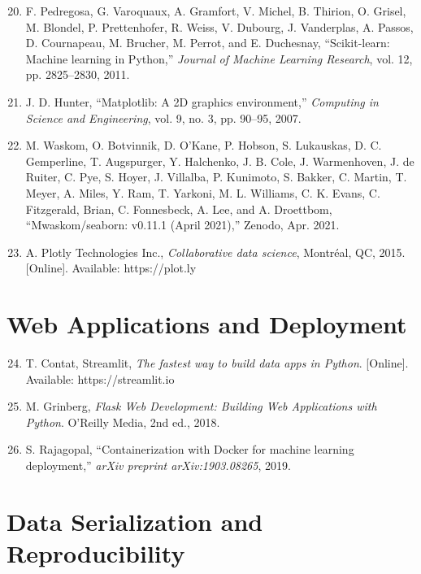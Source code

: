 \begin{enumerate}
  \setcounter{enumi}{19}
  \item F. Pedregosa, G. Varoquaux, A. Gramfort, V. Michel, B. Thirion, O. Grisel, M. Blondel, P. Prettenhofer, R. Weiss, V. Dubourg, J. Vanderplas, A. Passos, D. Cournapeau, M. Brucher, M. Perrot, and E. Duchesnay, ``Scikit-learn: Machine learning in Python,'' \textit{Journal of Machine Learning Research}, vol. 12, pp. 2825--2830, 2011.
  
  \item J. D. Hunter, ``Matplotlib: A 2D graphics environment,'' \textit{Computing in Science and Engineering}, vol. 9, no. 3, pp. 90--95, 2007.
  
  \item M. Waskom, O. Botvinnik, D. O'Kane, P. Hobson, S. Lukauskas, D. C. Gemperline, T. Augspurger, Y. Halchenko, J. B. Cole, J. Warmenhoven, J. de Ruiter, C. Pye, S. Hoyer, J. Villalba, P. Kunimoto, S. Bakker, C. Martin, T. Meyer, A. Miles, Y. Ram, T. Yarkoni, M. L. Williams, C. K. Evans, C. Fitzgerald, Brian, C. Fonnesbeck, A. Lee, and A. Droettbom, ``Mwaskom/seaborn: v0.11.1 (April 2021),'' Zenodo, Apr. 2021.
  
  \item A. Plotly Technologies Inc., \textit{Collaborative data science}, Montréal, QC, 2015. [Online]. Available: https://plot.ly
\end{enumerate}

\section*{Web Applications and Deployment}

\begin{enumerate}
  \setcounter{enumi}{23}
  \item T. Contat, Streamlit, \textit{The fastest way to build data apps in Python}. [Online]. Available: https://streamlit.io
  
  \item M. Grinberg, \textit{Flask Web Development: Building Web Applications with Python}. O'Reilly Media, 2nd ed., 2018.
  
  \item S. Rajagopal, ``Containerization with Docker for machine learning deployment,'' \textit{arXiv preprint arXiv:1903.08265}, 2019.
\end{enumerate}

\section*{Data Serialization and Reproducibility}

